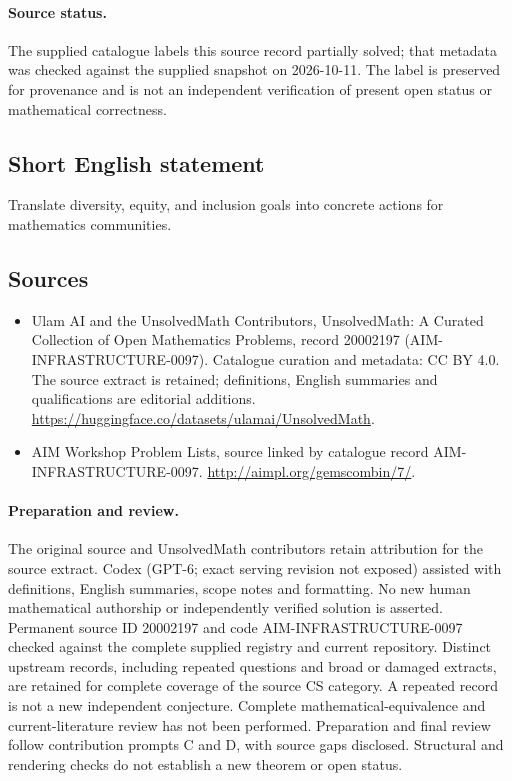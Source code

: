 \documentclass[11pt]{article}
\begin{document}
\paragraph{Source status.}
The supplied catalogue labels this source record partially solved; that metadata was checked against the supplied snapshot on 2026-10-11. The label is preserved for provenance and is not an independent verification of present open status or mathematical correctness.
\subsection{Short English statement}
Translate diversity, equity, and inclusion goals into concrete actions for mathematics communities.
\subsection{Sources}
\begin{itemize}
\item[\hypertarget{source:20002197:1}{S1}] Ulam AI and the UnsolvedMath Contributors, UnsolvedMath: A Curated Collection of Open Mathematics Problems, record 20002197 (AIM-INFRASTRUCTURE-0097). Catalogue curation and metadata: CC BY 4.0. The source extract is retained; definitions, English summaries and qualifications are editorial additions.
\url{https://huggingface.co/datasets/ulamai/UnsolvedMath}.
\item[\hypertarget{source:20002197:2}{S2}] AIM Workshop Problem Lists, source linked by catalogue record AIM-INFRASTRUCTURE-0097.
\url{http://aimpl.org/gemscombin/7/}.
\end{itemize}
\paragraph{Preparation and review.}
The original source and UnsolvedMath contributors retain attribution for the source extract. Codex (GPT-6; exact serving revision not exposed) assisted with definitions, English summaries, scope notes and formatting. No new human mathematical authorship or independently verified solution is asserted. Permanent source ID 20002197 and code AIM-INFRASTRUCTURE-0097 checked against the complete supplied registry and current repository. Distinct upstream records, including repeated questions and broad or damaged extracts, are retained for complete coverage of the source CS category. A repeated record is not a new independent conjecture. Complete mathematical-equivalence and current-literature review has not been performed. Preparation and final review follow contribution prompts C and D, with source gaps disclosed. Structural and rendering checks do not establish a new theorem or open status.
\label{end:20002197}
\end{document}
